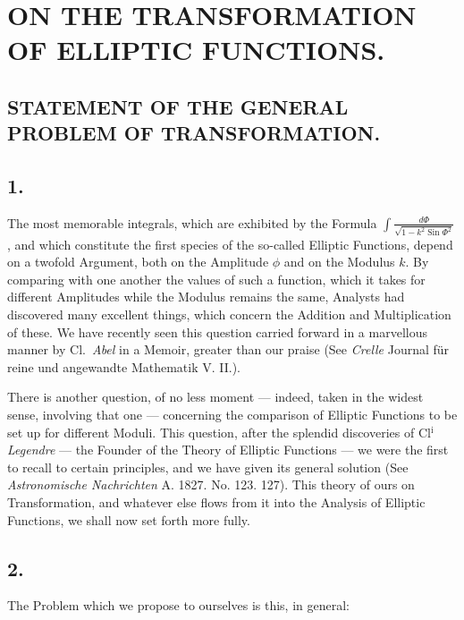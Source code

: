 \documentclass{article}
\begin{document}

\section*{ON THE TRANSFORMATION OF ELLIPTIC FUNCTIONS.}

\subsection*{STATEMENT OF THE GENERAL PROBLEM OF TRANSFORMATION.}

\subsection*{1.}

The most memorable integrals, which are exhibited by the Formula $\displaystyle\int\frac{d\Phi}{\sqrt{1-k^{2}\operatorname{Sin}\Phi^{2}}}$, and which constitute the first species of the so-called Elliptic Functions, depend on a twofold Argument, both on the Amplitude $\phi$ and on the Modulus $k$. By comparing with one another the values of such a function, which it takes for different Amplitudes while the Modulus remains the same, Analysts had discovered many excellent things, which concern the Addition and Multiplication of these. We have recently seen this question carried forward in a marvellous manner by Cl.\ \emph{Abel} in a Memoir, greater than our praise (See \emph{Crelle} Journal für reine und angewandte Mathematik V. II.).

There is another question, of no less moment --- indeed, taken in the widest sense, involving that one --- concerning the comparison of Elliptic Functions to be set up for different Moduli. This question, after the splendid discoveries of Cl$^{\mathrm{i}}$ \emph{Legendre} --- the Founder of the Theory of Elliptic Functions --- we were the first to recall to certain principles, and we have given its general solution (See \emph{Astronomische Nachrichten} A. 1827. No. 123. 127). This theory of ours on Transformation, and whatever else flows from it into the Analysis of Elliptic Functions, we shall now set forth more fully.


\subsection*{2.}

The Problem which we propose to ourselves is this, in general:
\end{document}
